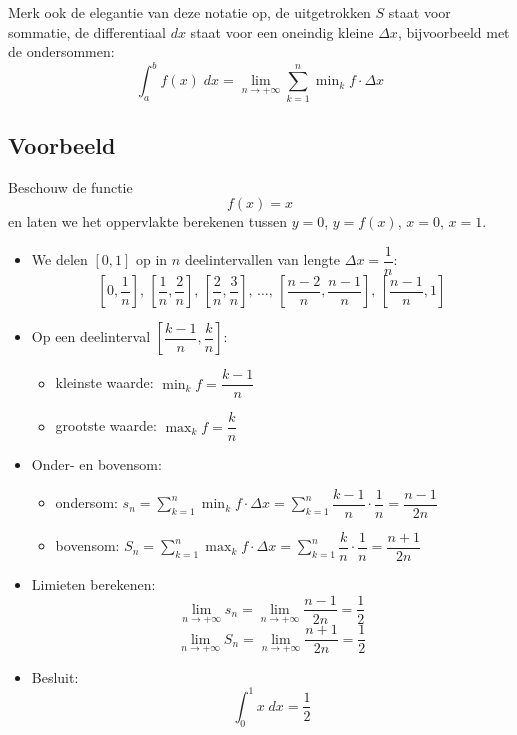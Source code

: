 \documentclass[a4paper,12pt, twoside]{article}
\begin{document}
Merk ook de elegantie van deze notatie op, de uitgetrokken $S$ staat voor sommatie, de differentiaal $dx$ staat voor een oneindig kleine $\Delta x$, bijvoorbeeld met de ondersommen:
$$\int_a^b f(x)\;dx = \lim_{n\to+\infty}\sum_{k=1}^n \min\nolimits_k f\cdot\Delta x$$

\subsection{Voorbeeld}

Beschouw de functie
$$f(x)=x$$
en laten we het oppervlakte berekenen tussen $y=0$, $y=f(x)$, $x=0$, $x=1$.

\begin{center}
\end{center}

\begin{itemize}
  \item We delen $[0,1]$ op in $n$ deelintervallen van lengte $\Delta x=\dfrac{1}{n}$:
  $$[0,\dfrac{1}{n}],\, [\dfrac{1}{n},\dfrac{2}{n}],\, [\dfrac{2}{n},\dfrac{3}{n}],\, \ldots,\, [\dfrac{n-2}{n},\dfrac{n-1}{n}],\, [\dfrac{n-1}{n},1]$$
  \item Op een deelinterval $[\dfrac{k-1}{n},\dfrac{k}{n}]$:
  \begin{itemize}
    \item kleinste waarde: $\min_k f = \dfrac{k-1}{n}$
    \item grootste waarde: $\max_k f = \dfrac{k}{n}$
  \end{itemize}
  \item Onder- en bovensom:
  \begin{itemize}
    \item ondersom: $s_n=\sum^n_{k=1}\min_k f \cdot \Delta x=\sum^n_{k=1}\dfrac{k-1}{n}\cdot\dfrac{1}{n}=\dfrac{n-1}{2n}$
    \item bovensom: $S_n=\sum^n_{k=1}\max_k f \cdot \Delta x=\sum^n_{k=1}\dfrac{k}{n}\cdot\dfrac{1}{n}=\dfrac{n+1}{2n}$
  \end{itemize}
  \item Limieten berekenen:
  $$\lim_{n\to+\infty}s_n=\lim_{n\to+\infty}\dfrac{n-1}{2n}=\dfrac{1}{2}$$
  $$\lim_{n\to+\infty}S_n=\lim_{n\to+\infty}\dfrac{n+1}{2n}=\dfrac{1}{2}$$
  \item Besluit:
  $$\int_0^1 x\;dx=\dfrac{1}{2}$$
\end{itemize}
\end{document}
